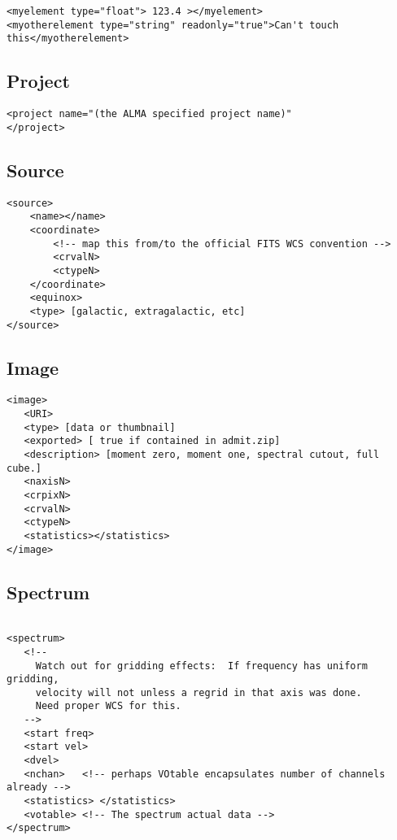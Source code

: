 \documentclass{article}
\begin{document}
\footnotesize
\begin{verbatim}
<myelement type="float"> 123.4 ></myelement>
<myotherelement type="string" readonly="true">Can't touch this</myotherelement>
\end{verbatim}
\normalsize

\subsection{Project}

\footnotesize
\begin{verbatim}
<project name="(the ALMA specified project name)"
</project>
\end{verbatim}
\normalsize

\subsection{Source}

\footnotesize
\begin{verbatim}
<source>
    <name></name>
    <coordinate>
        <!-- map this from/to the official FITS WCS convention -->
        <crvalN>
        <ctypeN>
    </coordinate>
    <equinox>
    <type> [galactic, extragalactic, etc]
</source>
\end{verbatim}
\normalsize

\subsection{Image }

\footnotesize
\begin{verbatim}
<image>
   <URI>
   <type> [data or thumbnail]
   <exported> [ true if contained in admit.zip]
   <description> [moment zero, moment one, spectral cutout, full cube.] 
   <naxisN>
   <crpixN>
   <crvalN>
   <ctypeN>
   <statistics></statistics>
</image>
\end{verbatim}
\normalsize


\subsection{Spectrum}

\footnotesize
\begin{verbatim}

<spectrum>
   <!-- 
     Watch out for gridding effects:  If frequency has uniform gridding, 
     velocity will not unless a regrid in that axis was done. 
     Need proper WCS for this.
   -->
   <start freq>
   <start vel>
   <dvel>
   <nchan>   <!-- perhaps VOtable encapsulates number of channels already -->
   <statistics> </statistics> 
   <votable> <!-- The spectrum actual data --> 
</spectrum>
\end{verbatim}
\end{document}
